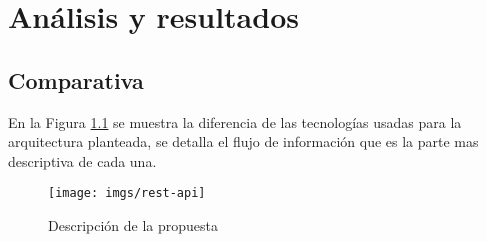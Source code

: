 \chapter{Análisis y resultados}
\section{Comparativa}
En la Figura \ref{fig:api} se muestra la diferencia de las tecnologías usadas para la arquitectura planteada, se detalla el flujo de información que es la parte mas descriptiva de cada una.
\begin{figure}[H]
\centering
\texttt{[image: imgs/rest-api]}
\caption{Descripción de la propuesta}
\label{fig:api}
\end{figure}

